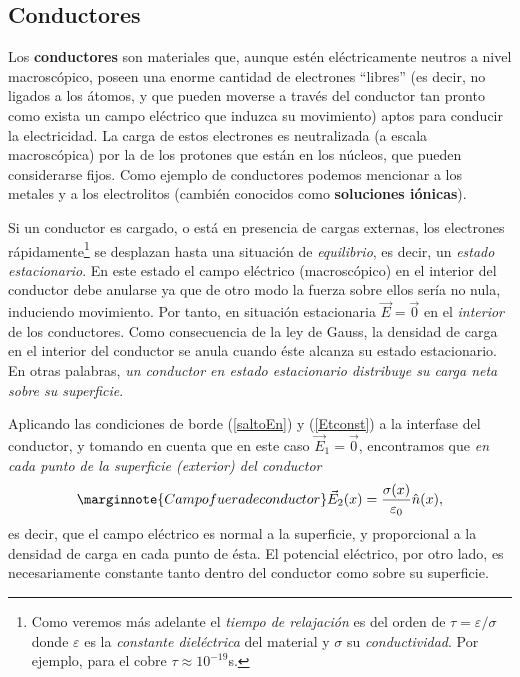 \subsection{Conductores}

Los \textbf{conductores} son materiales que, aunque estén
eléctricamente neutros a nivel macros\-có\-pi\-co, poseen
una enorme cantidad de electrones ``libres'' (es decir,  no ligados a
los átomos, y que pueden moverse a través del conductor tan pronto como
exista un campo eléctrico que induzca su movimiento)
aptos para conducir la electricidad. La carga de estos electrones es
neutralizada (a escala macroscópica) por la de los protones que están en los n\'{u}cleos, que pueden considerarse fijos. Como ejemplo de conductores podemos mencionar a los metales y a los electrolitos (cambién conocidos como \textbf{soluciones iónicas}).

Si un conductor es cargado, o está en presencia de cargas externas, los electrones rápidamente\footnote{Como veremos más adelante el \textit{tiempo de relajación} es del orden de $\tau=\varepsilon/\sigma$ donde $\varepsilon$ es la \textit{constante dieléctrica} del material y $\sigma$ su \textit{conductividad}. Por ejemplo, para el cobre $\tau\approx 10^{-19}$s.} se desplazan hasta una situación de \textit{equilibrio}, es decir, un \textit{estado estacionario}. En este
estado el campo eléctrico (macroscópico) en el interior del conductor debe anularse ya que de otro modo la fuerza sobre ellos sería no nula, induciendo
movimiento. Por tanto, en situación estacionaria $\vec{E}=\vec{0}$ en el
\textit{interior} de los conductores. Como consecuencia de la ley de Gauss, la
densidad de carga en el interior del conductor se anula cuando éste
alcanza su estado estacionario. En otras palabras, \textit{un conductor en estado estacionario distribuye su carga neta sobre su superficie}.

Aplicando las condiciones de borde (\ref{saltoEn}) y (\ref{Etconst}) a la
interfase del conductor, y tomando en cuenta que en este caso
$\vec{E}_1=\vec{0}$, encontramos que \textit{en cada punto de la superficie (exterior) del conductor}
\begin{equation}\marginnote{Campo fuera de conductor}
 \vec{E}_2(x)=\frac{\sigma(x)}{\varepsilon_0}\hat{n}(x), \label{Econd}
\end{equation}
es decir, que el campo eléctrico es normal a la superficie, y proporcional a la densidad de carga en cada punto de ésta. El potencial eléctrico, por otro lado, es necesariamente constante tanto dentro del conductor como sobre su superficie.

